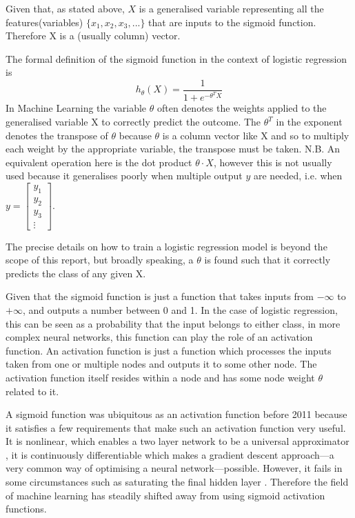 \documentclass[a4paper,fleqn,usenatbib]{mnras}
\begin{document}
Given that, as stated above, $X$ is a generalised variable representing all the features(variables) $\{x_1,x_2,x_3,...\}$ that are inputs to the sigmoid function. Therefore X is a (usually column) vector.

The formal definition of the sigmoid function in the context of logistic regression is 
\begin{equation}
	h_\theta(X)=\frac{1}{1+e^{-\theta^T X}}
\end{equation}
In Machine Learning the variable $\theta$ often denotes the weights applied to the generalised variable X to correctly predict the outcome. The $\theta^T$ in the exponent denotes the transpose of $\theta$ because $\theta$ is a column vector like X and so to multiply each weight by the appropriate variable, the transpose must be taken. N.B. An equivalent operation here is the dot product $\theta \cdot X$, however this is not usually used because it generalises poorly when multiple output $y$ are needed, i.e. when $y=\begin{bmatrix}
           y_{1} \\
           y_{2} \\
           y_{3} \\
           \vdots
         \end{bmatrix}$.

The precise details on how to train a logistic regression model is beyond the scope of this report, but broadly speaking, a $\theta$ is found such that it correctly predicts the class of any given X. 

Given that the sigmoid function is just a function that takes inputs from $-\infty$ to $+\infty$, and outputs a number between 0 and 1. In the case of logistic regression, this can be seen as a probability that the input belongs to either class, in more complex neural networks, this function can play the role of an activation function. An activation function is just a function which processes the inputs taken from one or multiple nodes and outputs it to some other node. The activation function itself resides within a node and has some node weight $\theta$ related to it. 

A sigmoid function was ubiquitous as an activation function before 2011 because it satisfies a few requirements that make such an activation function very useful. It is nonlinear, which enables a two layer network to be a universal approximator \cite{UniversalApproximationTheorem}, it is continuously differentiable which makes a gradient descent approach---a very common way of optimising a neural network---possible. However, it fails in some circumstances such as saturating the final hidden layer \cite{ReLu}. Therefore the field of machine learning has steadily shifted away from using sigmoid activation functions.
\end{document}
